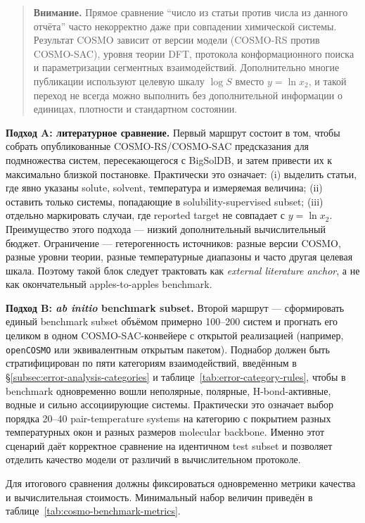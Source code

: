 \documentclass[11pt]{article}
\newcommand{\warnnote}[1]{\begin{quote}\textbf{Внимание.} #1\end{quote}}
\begin{document}
\warnnote{Прямое сравнение ``число из статьи против числа из данного отчёта'' часто некорректно даже при совпадении химической системы. Результат COSMO зависит от версии модели (COSMO-RS против COSMO-SAC), уровня теории DFT, протокола конформационного поиска и параметризации сегментных взаимодействий. Дополнительно многие публикации используют целевую шкалу $\log S$ вместо $y=\ln x_2$, и такой переход не всегда можно выполнить без дополнительной информации о единицах, плотности и стандартном состоянии.}

\textbf{Подход A: литературное сравнение.} Первый маршрут состоит в том, чтобы собрать опубликованные COSMO-RS/COSMO-SAC предсказания для подмножества систем, пересекающегося с BigSolDB, и затем привести их к максимально близкой постановке. Практически это означает: (i) выделить статьи, где явно указаны solute, solvent, температура и измеряемая величина; (ii) оставить только системы, попадающие в solubility-supervised subset; (iii) отдельно маркировать случаи, где reported target не совпадает с $y=\ln x_2$. Преимущество этого подхода --- низкий дополнительный вычислительный бюджет. Ограничение --- гетерогенность источников: разные версии COSMO, разные уровни теории, разные температурные диапазоны и часто другая целевая шкала. Поэтому такой блок следует трактовать как \textit{external literature anchor}, а не как окончательный apples-to-apples benchmark.

\textbf{Подход B: \textit{ab initio} benchmark subset.} Второй маршрут --- сформировать единый benchmark subset объёмом примерно 100--200 систем и прогнать его целиком в одном COSMO-SAC-конвейере с открытой реализацией (например, \texttt{openCOSMO} или эквивалентным открытым пакетом). Поднабор должен быть стратифицирован по пяти категориям взаимодействий, введённым в §\ref{subsec:error-analysis-categories} и таблице~\ref{tab:error-category-rules}, чтобы в benchmark одновременно вошли неполярные, полярные, H-bond-активные, водные и сильно ассоциирующие системы. Практически это означает выбор порядка 20--40 pair-temperature systems на категорию с покрытием разных температурных окон и разных размеров molecular backbone. Именно этот сценарий даёт корректное сравнение на идентичном test subset и позволяет отделить качество модели от различий в вычислительном протоколе.

Для итогового сравнения должны фиксироваться одновременно метрики качества и вычислительная стоимость. Минимальный набор величин приведён в таблице~\ref{tab:cosmo-benchmark-metrics}.
\end{document}
